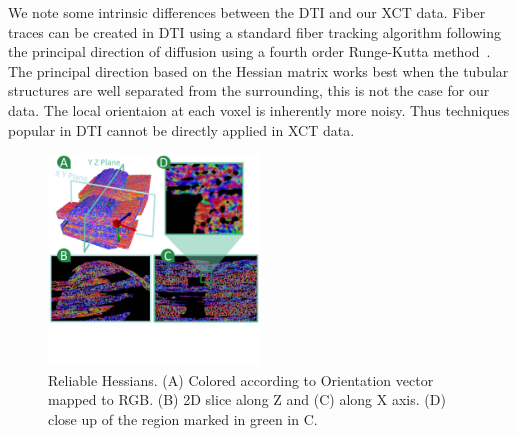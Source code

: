  
We note some intrinsic differences between the DTI and our XCT data. Fiber traces can be created in DTI using a standard fiber tracking algorithm following the principal direction of diffusion using a fourth order Runge-Kutta method~\cite{Brun2003}. The principal direction based on the Hessian matrix works best when the tubular structures are well separated from the surrounding, this is not the case for our data. The local orientaion at each voxel is inherently more noisy. Thus techniques popular in DTI cannot be directly applied in XCT data.

%
\begin{figure}[tb]
\centering
\includegraphics[width=0.5\textwidth]{imagesMT2014/image2B}
\caption{Reliable Hessians. (A) Colored according to Orientation vector mapped to RGB. (B) 2D slice along Z and (C) along X axis. (D) close up of the region marked in green in C.}
\label{fig:reliable_hessian}
\end{figure}


